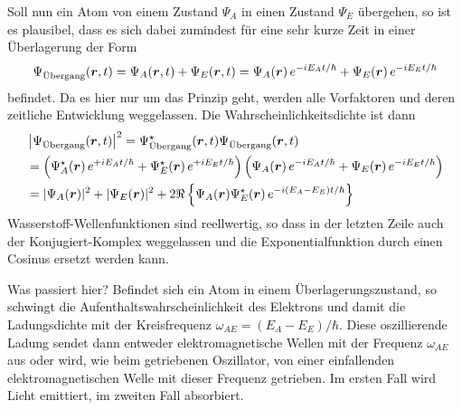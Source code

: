 Soll nun ein Atom von einem Zustand $\Psi_A$ in einen Zustand $\Psi_E$ übergehen, so ist es plausibel, dass es sich dabei zumindest für eine sehr kurze Zeit in einer Überlagerung der Form 
\begin{equation}
    \Psi_\text{Übergang} (\boldsymbol{r}, t) = \Psi_A(\boldsymbol{r}, t) + \Psi_E(\boldsymbol{r}, t) = 
    \Psi_A(\boldsymbol{r}) \, e^{-i E_A t / \hbar} +  \Psi_E(\boldsymbol{r}) \, e^{-i E_E t / \hbar}
\end{equation}
befindet. Da es hier nur um das Prinzip geht, werden alle Vorfaktoren und deren zeitliche Entwicklung weggelassen. Die Wahrscheinlichkeitsdichte ist dann
\begin{align}
    & \left| \Psi_\text{Übergang} (\boldsymbol{r}, t)  \right|^2 =  \Psi_\text{Übergang}^\star (\boldsymbol{r}, t) \Psi_\text{Übergang} (\boldsymbol{r}, t)  \\
   & =  \left(  \Psi_A^\star(\boldsymbol{r}) \, e^{+i E_A t / \hbar} +  \Psi_E^\star(\boldsymbol{r}) \, e^{+i E_E t / \hbar} \right)
    \left(  \Psi_A(\boldsymbol{r}) \, e^{-i E_A t / \hbar} +  \Psi_E(\boldsymbol{r}) \, e^{-i E_E t / \hbar} \right) \\
    & = | \Psi_A(\boldsymbol{r})|^2 + | \Psi_E(\boldsymbol{r})|^2  + 2 \Re \left\{ \Psi_A(\boldsymbol{r})\Psi_E^\star(\boldsymbol{r})  \, e^{-i (E_A - E_E) t / \hbar}  \right\} 
\end{align}
Wasserstoff-Wellenfunktionen sind reellwertig, so dass in der letzten Zeile auch der Konjugiert-Komplex weggelassen und die Exponentialfunktion durch einen Cosinus ersetzt werden kann.

Was passiert hier? Befindet sich ein Atom in einem Überlagerungszustand, so schwingt die Aufenthaltswahrscheinlichkeit des Elektrons und damit die Ladungsdichte mit der Kreisfrequenz $\omega_{AE} = (E_A - E_E) / \hbar $. Diese oszillierende Ladung sendet dann entweder elektromagnetische Wellen mit der Frequenz $\omega_{AE}$ aus oder wird, wie beim getriebenen Oszillator, von einer einfallenden elektromagnetischen Welle mit dieser Frequenz getrieben. Im ersten Fall wird Licht emittiert, im zweiten Fall absorbiert.

